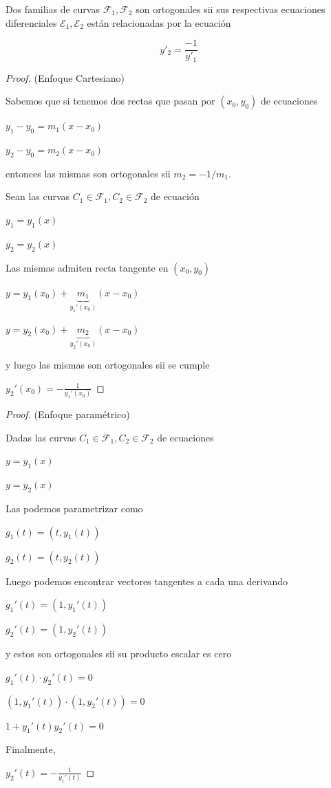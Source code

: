 \begin{proposition}

Dos familias de curvas $\mathcal{F}_1, \mathcal{F}_2$ son ortogonales sii sus respectivas ecuaciones diferenciales $\mathcal{E}_1, \mathcal{E}_2$ están relacionadas por la ecuación

$$ y'_2 = \frac{-1}{y'_1}$$

\end{proposition}

\begin{proof} (Enfoque Cartesiano)

Sabemos que si tenemos dos rectas que pasan por $(x_0, y_0)$ de ecuaciones 

$ y_1 - y_0 = m_1 (x-x_0)$

$ y_2 - y_0 = m_2 (x-x_0)$

entonces las mismas son ortogonales sii $m_2 = -1/m_1$.

Sean las curvas $C_1 \in \mathcal{F}_1, C_2 \in \mathcal{F}_2$ de ecuación

$ y_1 = y_1(x)$

$ y_2 = y_2(x)$

Las mismas admiten recta tangente en $(x_0, y_0)$

$ y = y_1(x_0) + \underbrace{m_1}_{y_1'(x_0)} (x-x_0)$ 

$ y = y_2(x_0) + \underbrace{m_2}_{y_2'(x_0)} (x-x_0)$ 

y luego las mismas son ortogonales sii se cumple

$ y_2'(x_0) = - \frac{1}{y_1'(x_0)}$
\end{proof}

\begin{proof} (Enfoque paramétrico)

Dadas las curvas $C_1 \in \mathcal{F}_1, C_2 \in \mathcal{F}_2$ de ecuaciones

$ y = y_1(x)$

$ y = y_2(x)$ 

Las podemos parametrizar como

$ g_1(t) = (t, y_1(t) )$

$ g_2(t) = (t, y_2(t) )$

Luego podemos encontrar vectores tangentes a cada una derivando

$ g_1'(t) = (1, y_1'(t) )$

$ g_2'(t) = (1, y_2'(t) )$

y estos son ortogonales sii su producto escalar es cero

$ g_1'(t) \cdot g_2'(t) = 0$

$ (1,y_1'(t)) \cdot (1, y_2'(t)) = 0$

$ 1 + y_1'(t) y_2'(t) = 0$

Finalmente,

$ y_2'(t) = -\frac{1}{y_1'(t)}$
\end{proof}



